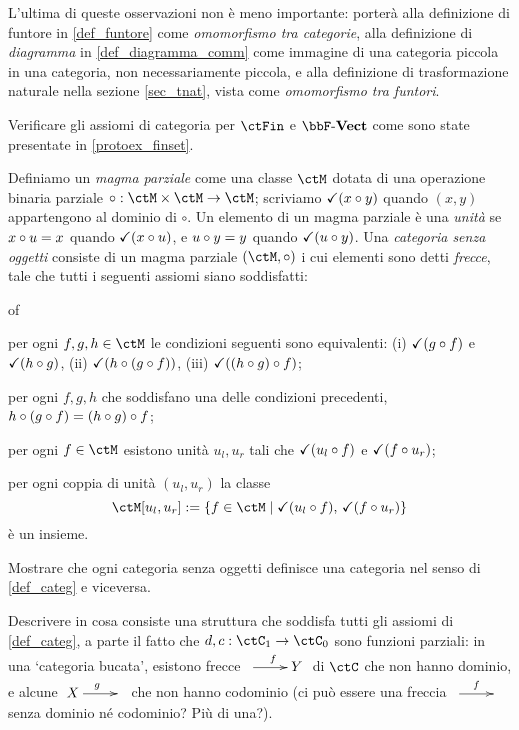 L'ultima di queste osservazioni non è meno importante: porterà alla definizione di funtore in \ref{def_funtore} come \emph{omomorfismo tra categorie}, alla definizione di \emph{diagramma} in \ref{def_diagramma_comm} come immagine di una categoria piccola in una categoria, non necessariamente piccola, e alla definizione di trasformazione naturale nella sezione \ref{sec_tnat}, vista come \emph{omomorfismo tra funtori}.
\begin{esercizi}
	\item \label{jgdasoh_4} Verificare gli assiomi di categoria per \(\ctFin\) e \(\ctVect\) come sono state presentate in \ref{protoex_finset}.
	\item \label{jgdasoh_1} Definiamo un \emph{magma parziale} come una classe \(\ctM\) dotata di una operazione binaria parziale \(\circ : \ctM\times\ctM\to\ctM\); scriviamo \(\checkmark(x\circ y)\) quando \((x,y)\) appartengono al dominio di \(\circ\). Un elemento di un magma parziale è una \emph{unità} se \(x\circ u = x\) quando \(\checkmark(x\circ u)\), e \(u\circ y = y\) quando \(\checkmark(u\circ y)\). Una \emph{categoria senza oggetti} consiste di un magma parziale \((\ctM,\cmp)\) i cui elementi sono detti \emph{frecce}, tale che tutti i seguenti assiomi siano soddisfatti:
	\begin{enumtag}{of}
		\item per ogni \(f,g,h\in\ctM\) le condizioni seguenti sono equivalenti: (i) \(\checkmark(g\circ f)\) e \(\checkmark(h\circ g)\), (ii) \(\checkmark(h\circ (g\circ f))\), (iii) \(\checkmark((h\circ g)\circ f)\);
		\item per ogni \(f,g,h\) che soddisfano una delle condizioni precedenti, \(h\circ (g\circ f) = (h\circ g)\circ f\);
		\item per ogni \(f\in\ctM\) esistono unità \(u_l,u_r\) tali che \(\checkmark(u_l\circ f)\) e \(\checkmark(f\circ u_r)\);
		\item per ogni coppia di unità \((u_l,u_r)\) la classe
		\[\ctM[u_l,u_r] := \{f\in\ctM\mid \checkmark(u_l\cmp f),\,\checkmark(f\cmp u_r)\}\]
		è un insieme.
	\end{enumtag}
	Mostrare che ogni categoria senza oggetti definisce una categoria nel senso di \ref{def_categ} e viceversa.
	\item \label{jgdasoh_2} Descrivere in cosa consiste una struttura che soddisfa tutti gli assiomi di \ref{def_categ}, a parte il fatto che \(d,c : \ctC_1\to\ctC_0\) sono funzioni parziali: in una `categoria bucata', esistono frecce \(\xymatrix{{} \ar[r]^f & Y}\) di \(\ctC\) che non hanno dominio, e alcune \(\xymatrix{X \ar[r]^g & {}}\) che non hanno codominio (ci può essere una freccia \(\xymatrix{{} \ar[r]^f & {}}\) senza dominio né codominio? Più di una?).

\end{esercizi}
